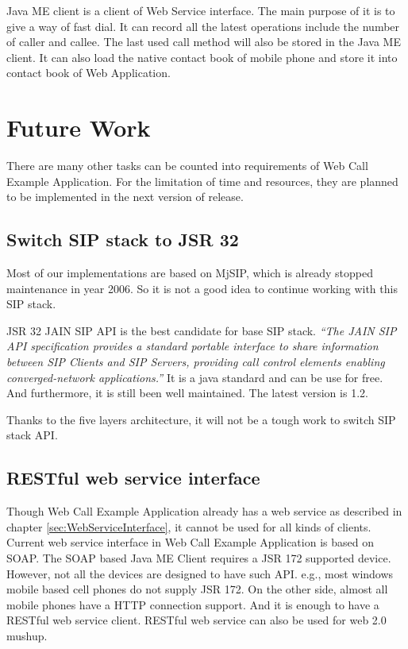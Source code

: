 \textsf{Java ME client} is a client of Web Service interface. The main purpose of it is to give a way of fast dial. It can record all the latest operations include the number of caller and callee. The last used call method will also be stored in the Java ME client. It can also load the native contact book of mobile phone and store it into contact book of Web Application.


\section{Future Work}
\label{sec:Conclusion:FutureWork}

There are many other tasks can be counted into requirements of Web Call Example Application. For the limitation of time and resources, they are planned to be implemented in the next version of release.

\subsection{Switch SIP stack to JSR 32}

Most of our implementations are based on MjSIP, which is already stopped maintenance in year 2006. \cite{MjSip} So it is not a good idea to continue working with this SIP stack. 

JSR 32 JAIN\texttrademark{} SIP API is the best candidate for base SIP stack. \textit{``The JAIN\texttrademark{} SIP API specification provides a standard portable interface to share information between SIP Clients and SIP Servers, providing call control elements enabling converged-network applications.''} \cite{JSR32} It is a java standard and can be use for free. And furthermore, it is still been well maintained. The latest version is 1.2.

Thanks to the five layers architecture, it will not be a tough work to switch SIP stack API.

\subsection{RESTful web service interface}
\label{sec:Conclusion:FutureWork:RESTfulWebServiceInterface}

Though Web Call Example Application already has a web service as described in chapter \ref{sec:WebServiceInterface}, it cannot be used for all kinds of clients. Current web service interface in Web Call Example Application is based on SOAP. The SOAP based Java ME Client requires a JSR 172 supported device. However, not all the devices are designed to have such API. e.g., most windows mobile based cell phones do not supply JSR 172. On the other side, almost all mobile phones have a HTTP connection support. And it is enough to have a RESTful web service client. RESTful web service can also be used for web 2.0 mushup.

